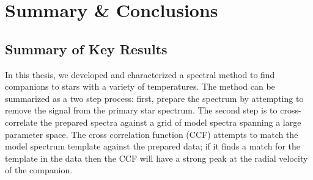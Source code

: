 \documentclass{utthesis}
\begin{document}





















\chapter{Summary \& Conclusions}
\label{chap:conclusions}

\section{Summary of Key Results}

In this thesis, we developed and characterized a spectral method to find companions to stars with a variety of temperatures. The method can be summarized as a two step process: first, prepare the spectrum by attempting to remove the signal from the primary star spectrum. The second step is to cross-correlate the prepared spectra against a grid of model spectra spanning a large parameter space. The cross correlation function (CCF) attempts to match the model spectrum template against the prepared data; if it finds a match for the template in the data then the CCF will have a strong peak at the radial velocity of the companion.
\end{document}
